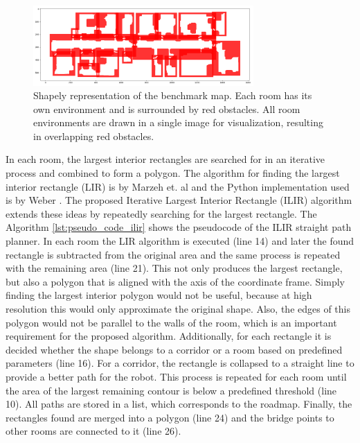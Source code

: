 \begin{figure}[h]
    \centering
    \includegraphics[width=0.75\textwidth]{figures/50_implementation/ruy_shapely.png}
    \caption[Shapely representation of the benchmark map]{Shapely representation of the benchmark map. Each room has its own environment and is surrounded by red obstacles. All room environments are drawn in a single image for visualization, resulting in overlapping red obstacles.}
    \label{fig:ryu_shapely}
\end{figure}

In each room, the largest interior rectangles are searched for in an iterative process and combined to form a polygon. The algorithm for finding the largest interior rectangle (LIR) is by Marzeh et. al \cite{marzeh_algorithm_2019} and the Python implementation used is by Weber \cite{weber_largest_2023}. The proposed Iterative Largest Interior Rectangle (ILIR) algorithm extends these ideas by repeatedly searching for the largest rectangle. The Algorithm \ref{lst:pseudo_code_ilir} shows the pseudocode of the ILIR straight path planner. In each room the LIR algorithm is executed (line 14) and later the found rectangle is subtracted from the original area and the same process is repeated with the remaining area (line 21). This not only produces the largest rectangle, but also a polygon that is aligned with the axis of the coordinate frame. Simply finding the largest interior polygon would not be useful, because at high resolution this would only approximate the original shape. Also, the edges of this polygon would not be parallel to the walls of the room, which is an important requirement for the proposed algorithm. Additionally, for each rectangle it is decided whether the shape belongs to a corridor or a room based on predefined parameters (line 16). For a corridor, the rectangle is collapsed to a straight line to provide a better path for the robot. This process is repeated for each room until the area of the largest remaining contour is below a predefined threshold (line 10). All paths are stored in a list, which corresponds to the roadmap. Finally, the rectangles found are merged into a polygon (line 24) and the bridge points to other rooms are connected to it (line 26).

